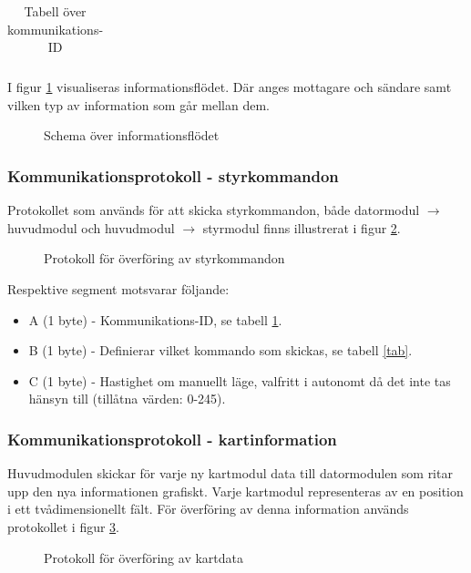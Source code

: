 \documentclass[11pt]{article}
\begin{document}
\begin{flushleft}
\begin{longtable}[c]{| l | l |}
\caption{Tabell över kommunikations-ID}\label{kommunikationstab}
\end{longtable}

I figur \ref{informationFlow} visualiseras informationsflödet. Där anges mottagare och sändare samt vilken typ av information som går mellan dem.

\begin{figure}[htbp]
\centering
\noindent\resizebox{1\linewidth}{!}{
	}
	\caption{Schema över informationsflödet\label{informationFlow}}	
\end{figure}

\subsubsection{Kommunikationsprotokoll - styrkommandon}
Protokollet som används för att skicka styrkommandon, både datormodul $\rightarrow$ huvudmodul och huvudmodul $\rightarrow$ styrmodul finns illustrerat i figur \ref{styrdata}.

\begin{figure}[htbp]
\centering
\noindent\resizebox{.8\linewidth}{!}{
	}
	\caption{Protokoll för överföring av styrkommandon\label{styrdata}}	
\end{figure}

Respektive segment motsvarar följande: 
\begin{itemize}
	\item A (1 byte) - Kommunikations-ID, se tabell \ref{kommunikationstab}.
	\item B (1 byte) - Definierar vilket kommando som skickas, se tabell \ref{tab}.
	\item C (1 byte) - Hastighet om manuellt läge, valfritt i autonomt då det inte tas hänsyn till (tillåtna värden: 0-245).
\end{itemize}

\subsubsection{Kommunikationsprotokoll - kartinformation}
Huvudmodulen skickar för varje ny kartmodul data till datormodulen som ritar upp den nya informationen grafiskt. Varje kartmodul representeras av en position i ett tvådimensionellt fält. För överföring av denna information används protokollet i figur \ref{kartdata}.

\begin{figure}[htbp]
\centering
\noindent\resizebox{.8\linewidth}{!}{
	}
	\caption{Protokoll för överföring av kartdata \label{kartdata}}	
\end{figure}


\end{flushleft}
\end{document}
